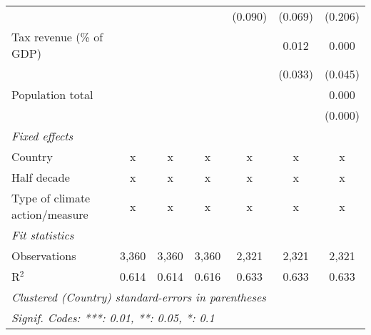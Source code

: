 \begin{tabular}{lcccccc}
                                                  &             &                &                & (0.090)        & (0.069)        & (0.206)\\   
   Tax revenue (\% of GDP)                        &             &                &                &                & 0.012          & 0.000\\   
                                                  &             &                &                &                & (0.033)        & (0.045)\\   
   Population total                               &             &                &                &                &                & 0.000\\   
                                                  &             &                &                &                &                & (0.000)\\   
   \emph{Fixed effects}\\
   Country                                        & x           & x              & x              & x              & x              & x\\  
   Half decade                                    & x           & x              & x              & x              & x              & x\\  
   Type of climate action/measure                 & x           & x              & x              & x              & x              & x\\  
   \midrule \emph{Fit statistics}\\
   Observations                                   & 3,360       & 3,360          & 3,360          & 2,321          & 2,321          & 2,321\\  
   R$^2$                                          & 0.614       & 0.614          & 0.616          & 0.633          & 0.633          & 0.633\\  
   \midrule
   \multicolumn{7}{l}{\emph{Clustered (Country) standard-errors in parentheses}}\\
   \multicolumn{7}{l}{\emph{Signif. Codes: ***: 0.01, **: 0.05, *: 0.1}}\\
\end{tabular}
\par\endgroup


